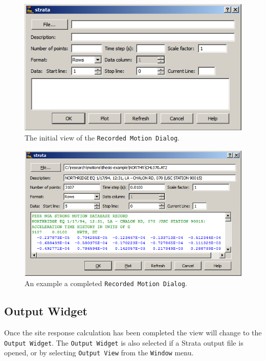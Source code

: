 \documentclass[11pt]{report}
\begin{document}
\begin{figure}
  \begin{center}
	\includegraphics[scale=0.65]{figures/strata/recordedMotionDialog.png}
  \end{center}
  \caption{The initial view of the \texttt{Recorded Motion Dialog}.}
  \label{fig:strata:recordedMotionDialog}
\end{figure}

\begin{figure}
  \begin{center}
	\includegraphics[scale=0.65]{figures/strata/recordedMotionDialogExample.png}
  \end{center}
  \caption{An example a completed \texttt{Recorded Motion Dialog}.}
  \label{fig:strata:recordedMotionDialogExample}
\end{figure}

\clearpage
\subsection{Output Widget}\label{ch:strata:particulars:outputWidget}
Once the site response calculation has been completed the view will change to the \texttt{Output
Widget}.  The \texttt{Output Widget} is also selected if a Strata output file is opened, or by
selecting \texttt{Output View} from the \texttt{Window} menu.  
\end{document}
